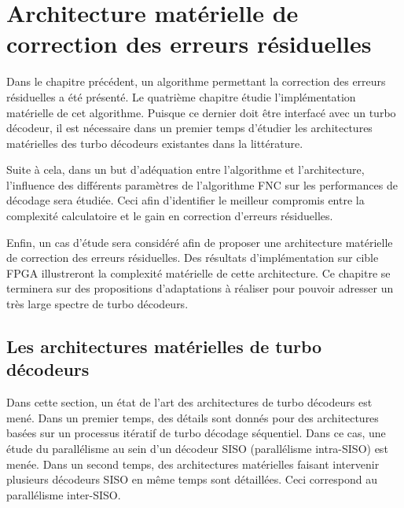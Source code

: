 \chapter{Architecture matérielle de correction des erreurs résiduelles}

Dans le chapitre précédent, un algorithme permettant la correction des erreurs résiduelles a été présenté. Le quatrième 
chapitre
étudie l'implémentation matérielle de cet algorithme. Puisque ce dernier doit être interfacé avec un
turbo décodeur, il est nécessaire dans un premier temps d'étudier les architectures matérielles des turbo décodeurs
existantes dans la littérature. 

Suite à cela, dans un but d'adéquation entre l'algorithme et l'architecture, l'influence des différents paramètres 
de l'algorithme FNC sur les performances de décodage sera étudiée. Ceci afin d'identifier le meilleur compromis entre la
complexité calculatoire et le gain en correction d'erreurs résiduelles.

Enfin, un cas d'étude sera considéré afin de proposer une architecture matérielle de correction des erreurs résiduelles.
Des résultats d’implémentation sur cible FPGA illustreront la complexité matérielle de cette architecture.
Ce chapitre se terminera sur des propositions d'adaptations à réaliser pour
pouvoir adresser un très large spectre de turbo décodeurs.

\vspace*{\fill}
\minitocTITI
\vspace*{\fill}
\newpage

\section{Les architectures matérielles de turbo décodeurs}
Dans cette section, un état de l'art des architectures de turbo décodeurs est mené. Dans un premier temps, des détails 
sont donnés pour des architectures basées sur un processus itératif de turbo décodage séquentiel. 
Dans ce cas, une étude du parallélisme au sein d'un décodeur SISO (parallélisme intra-SISO) est menée. Dans un second 
temps, des architectures matérielles faisant intervenir plusieurs décodeurs SISO en même temps sont détaillées. Ceci 
correspond au parallélisme inter-SISO.

